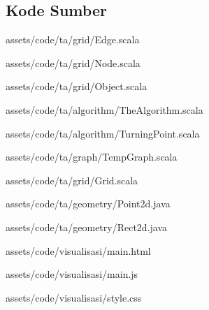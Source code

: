 \begin{appendices}

\chapter{Kode Sumber}
  \setcounter{figure}{0}
  \renewcommand{\thetable}{A.\arabic{table}}
  \renewcommand{\thefigure}{A.\arabic{figure}}

   {assets/code/ta/grid/Edge.scala}

   {assets/code/ta/grid/Node.scala}

   {assets/code/ta/grid/Object.scala}

   {assets/code/ta/algorithm/TheAlgorithm.scala}

   {assets/code/ta/algorithm/TurningPoint.scala}

   {assets/code/ta/graph/TempGraph.scala}

   {assets/code/ta/grid/Grid.scala}

   {assets/code/ta/geometry/Point2d.java}

   {assets/code/ta/geometry/Rect2d.java}
  
   {assets/code/visualisasi/main.html}
  
   {assets/code/visualisasi/main.js}
  
   {assets/code/visualisasi/style.css}
\end{appendices}